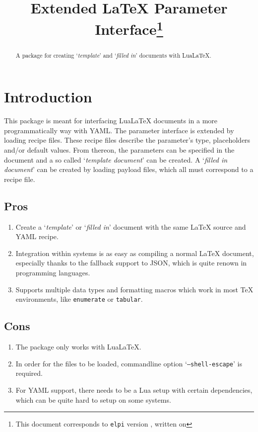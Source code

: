 \documentclass{ltxdoc}
\begin{document}
    \title{Extended \LaTeX{} Parameter Interface\thanks{This document corresponds to \texttt{elpi} version \gitversion, written on \gitdate}}
    \maketitle
    \begin{abstract}
        A package for creating `\textit{template}' and `\textit{filled in}' documents with Lua\LaTeX{}.
    \end{abstract}

    \tableofcontents

    \clearpage

    \section{Introduction}
    This package is meant for interfacing Lua\LaTeX{} documents in a more programmatically way with YAML\@.
    The parameter interface is extended by loading recipe files.
    These recipe files describe the parameter's type, placeholders and/or default values.
    From thereon, the parameters can be specified in the document and a so called `\textit{template document}' can be created.
    A `\textit{filled in document}' can be created by loading payload files, which all must correspond to a recipe file.

    \subsection{Pros}
    \begin{enumerate}[align=left]
        \item Create a `\textit{template}' or `\textit{filled in}' document with the same \LaTeX{} source and YAML recipe.
        \item Integration within systems is as easy as compiling a normal \LaTeX{} document, especially thanks to the fallback support to JSON, which is quite renown in programming languages.
        \item Supports multiple data types and formatting macros which work in most \TeX{} environments, like \texttt{enumerate} or \texttt{tabular}.
    \end{enumerate}

    \subsection{Cons}
    \begin{enumerate}[align=left]
        \item The package only works with Lua\LaTeX{}.
        \item In order for the files to be loaded, commandline option `\texttt{--shell-escape}' is required.
        \item For YAML support, there needs to be a Lua setup with certain dependencies, which can be quite hard to setup on some systems.
    \end{enumerate}
\end{document}
